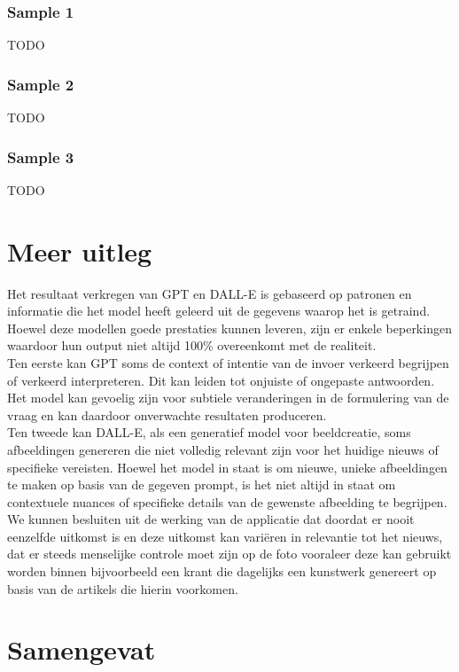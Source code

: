 \subsubsection{Sample 1}
 TODO
\subsubsection{Sample 2}
 TODO
\subsubsection{Sample 3}
 TODO
 
 
 
 
 
\section{Meer uitleg}
Het resultaat verkregen van GPT en DALL-E is gebaseerd op patronen en informatie die het model heeft geleerd uit de gegevens waarop het is getraind. Hoewel deze modellen goede prestaties kunnen leveren, zijn er enkele beperkingen waardoor hun output niet altijd 100\% overeenkomt met de realiteit. \\

Ten eerste kan GPT soms de context of intentie van de invoer verkeerd begrijpen of verkeerd interpreteren. Dit kan leiden tot onjuiste of ongepaste antwoorden. Het model kan gevoelig zijn voor subtiele veranderingen in de formulering van de vraag en kan daardoor onverwachte resultaten produceren. \\

Ten tweede kan DALL-E, als een generatief model voor beeldcreatie, soms afbeeldingen genereren die niet volledig relevant zijn voor het huidige nieuws of specifieke vereisten. Hoewel het model in staat is om nieuwe, unieke afbeeldingen te maken op basis van de gegeven prompt, is het niet altijd in staat om contextuele nuances of specifieke details van de gewenste afbeelding te begrijpen. \\

We kunnen besluiten uit de werking van de applicatie dat doordat er nooit eenzelfde uitkomst is en deze uitkomst kan variëren in relevantie tot het nieuws, dat er steeds menselijke controle moet zijn op de foto vooraleer deze kan gebruikt worden binnen bijvoorbeeld een krant die dagelijks een kunstwerk genereert op basis van de artikels die hierin voorkomen. 

 \section{Samengevat}